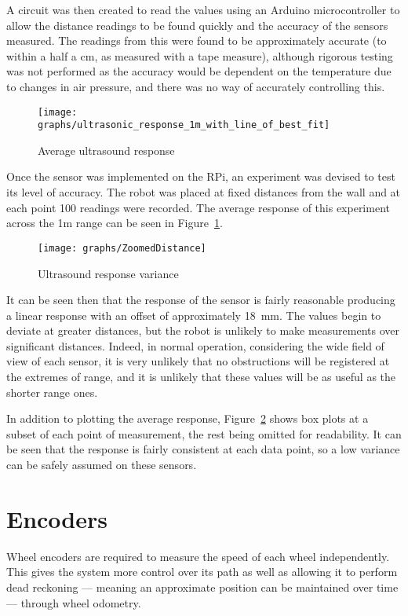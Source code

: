 A circuit was then created to read the values using an Arduino
microcontroller to allow the distance readings to be found quickly
and the accuracy of the sensors measured. The readings from this were
found to be approximately accurate (to within a half a \si{\cm},
as measured with a tape measure), although rigorous testing was not
performed as the accuracy would be dependent on the temperature due
to changes in air pressure, and there was no way of accurately controlling this.

\begin{figure}[!hb]
	\centering
	\texttt{[image: graphs/ultrasonic\_response\_1m\_with\_line\_of\_best\_fit]}
	\caption{Average ultrasound response}\label{fig:usline}
\end{figure}

Once the sensor was implemented on the RPi, an experiment was devised to test
its level of accuracy. The robot was placed at fixed distances from the wall
and at each point 100 readings were recorded. The average response of this
experiment across the 1m range can be seen in Figure~\ref{fig:usline}.

\begin{figure}[!hbt]
	\centering
	\texttt{[image: graphs/ZoomedDistance]}
	\caption{Ultrasound response variance}\label{fig:usboxplots}
\end{figure}

It can be seen then that the response of the sensor is fairly reasonable producing a linear response with an offset of approximately \SI{18}{\milli\meter}. The values begin to deviate at greater distances, but the robot is unlikely to make measurements over significant distances. Indeed, in normal operation, considering the wide field of view of each sensor, it is very unlikely that no obstructions will be registered at the extremes of range, and it is unlikely that these values will be as useful as the shorter range ones.

In addition to plotting the average response, Figure~\ref{fig:usboxplots}
shows box plots at a subset of each point of measurement, the rest being
omitted for readability. It can be seen that the response is fairly
consistent at each data point, so a low variance can be safely assumed on
these sensors.

\section{Encoders}\label{elec/encoder}
Wheel encoders are required to measure the speed of each wheel
independently. This gives the system more control over its path
as well as allowing it to perform dead reckoning --- meaning an
approximate position can be maintained over time --- through wheel odometry.

